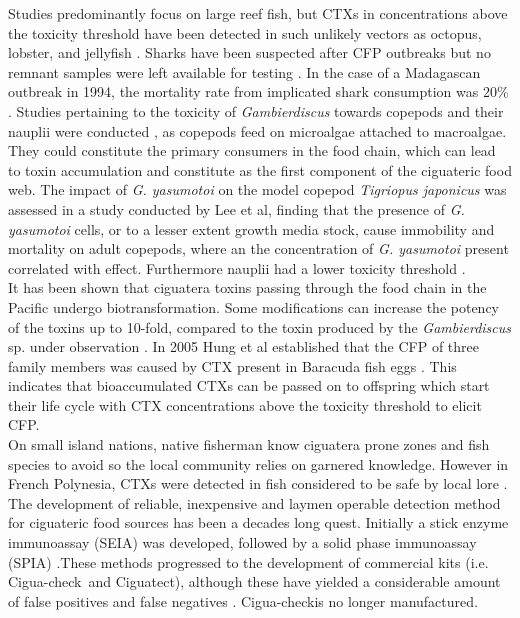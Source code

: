 \documentclass[12pt]{article}
\begin{document}
Studies predominantly focus on large reef fish, but CTXs in concentrations above the toxicity  threshold have been detected in such unlikely vectors as octopus, lobster, and jellyfish \cite{mak2013pacific,zlotnick1995ciguatera}.
Sharks have been suspected after CFP outbreaks but no remnant samples were left available for testing \cite{boisier1995fatal,lehane2000ciguatera,habermehl1994severe}. In the case of a Madagascan outbreak in 1994, the mortality rate from implicated shark consumption was 20\% \cite{habermehl1994severe}. 
Studies pertaining to the toxicity of \emph{Gambierdiscus} towards copepods and their nauplii were conducted \cite{lee2014toxicity}, as copepods feed on microalgae attached to macroalgae. They could constitute the primary consumers in the food chain, which can lead to toxin accumulation \cite{raisuddin2007copepod} and constitute as the first component of the ciguateric food web. The impact of \emph{G. yasumotoi} on the model copepod \emph{Tigriopus japonicus} was assessed in a study conducted by Lee et al, finding that the presence of \emph{G. yasumotoi} cells, or to a lesser extent growth media stock, cause immobility and mortality on adult copepods, where an the concentration of \emph{G. yasumotoi} present correlated with effect. Furthermore nauplii had a lower toxicity threshold \cite{lee2014toxicity}. \\
It has been shown that ciguatera toxins passing through the food chain in the Pacific undergo biotransformation. %
Some modifications can increase the potency of the toxins up to 10-fold, compared to the toxin produced by the \emph{Gambierdiscus} sp. under observation \cite{lewis2006ciguatera}.
In 2005 Hung et al established that the CFP of three family members was caused by CTX present in Baracuda fish eggs \cite{hung2005persistent}. This indicates that bioaccumulated CTXs can be passed on to offspring which start their life cycle with CTX concentrations above the toxicity threshold to elicit CFP.  \\ %
On small island nations, native fisherman know ciguatera prone zones and fish species to avoid so the local community relies on garnered knowledge. However in French Polynesia, CTXs were detected in fish considered to be safe by local lore  \cite{darius2007ciguatera}.
The development of reliable, inexpensive and laymen operable detection method for ciguateric food sources has been a decades long quest. Initially a stick enzyme immunoassay (SEIA) \cite{hokama1985rapid} was developed, followed by a solid phase immunoassay (SPIA) \cite{hokama1990simplified}.These methods progressed to the development of commercial kits (i.e. Cigua-check\textregistered \ and Ciguatect\textregistered), although these have yielded a considerable amount of false positives and false negatives \cite{wong2005study}. Cigua-check\textregistered is no longer manufactured.%
\end{document}
